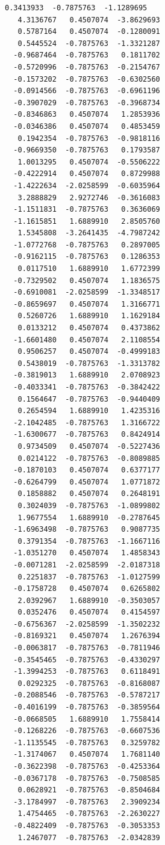 \documentclass[11pt]{article}
\begin{document}
\begin{Verbatim}[commandchars=\\\{\}]
   0.3413933  -0.7875763  -1.1289695
   4.3136767   0.4507074  -3.8629693
   0.5787164   0.4507074  -0.1280091
   0.5445524  -0.7875763  -1.3321287
  -0.9687464  -0.7875763   0.1811702
  -0.5720996  -0.7875763  -0.2154767
  -0.1573202  -0.7875763  -0.6302560
  -0.0914566  -0.7875763  -0.6961196
  -0.3907029  -0.7875763  -0.3968734
  -0.8346863   0.4507074   1.2853936
  -0.0346386   0.4507074   0.4853459
   0.1942354  -0.7875763  -0.9818116
  -0.9669350  -0.7875763   0.1793587
   1.0013295   0.4507074  -0.5506222
  -0.4222914   0.4507074   0.8729988
  -1.4222634  -2.0258599  -0.6035964
   3.2888829   2.9272746  -0.3616083
  -1.1511831  -0.7875763   0.3636069
  -1.1615851   1.6889910   2.8505760
   1.5345808  -3.2641435  -4.7987242
  -1.0772768  -0.7875763   0.2897005
  -0.9162115  -0.7875763   0.1286353
   0.0117510   1.6889910   1.6772399
  -0.7329502   0.4507074   1.1836575
  -0.6910081  -2.0258599  -1.3348517
  -0.8659697   0.4507074   1.3166771
   0.5260726   1.6889910   1.1629184
   0.0133212   0.4507074   0.4373862
  -1.6601480   0.4507074   2.1108554
   0.9506257   0.4507074  -0.4999183
   0.5438019  -0.7875763  -1.3313782
  -0.3819013   1.6889910   2.0708923
  -0.4033341  -0.7875763  -0.3842422
   0.1564647  -0.7875763  -0.9440409
   0.2654594   1.6889910   1.4235316
  -2.1042485  -0.7875763   1.3166722
  -1.6300677  -0.7875763   0.8424914
   0.9734509   0.4507074  -0.5227436
   0.0214122  -0.7875763  -0.8089885
  -0.1870103   0.4507074   0.6377177
  -0.6264799   0.4507074   1.0771872
   0.1858882   0.4507074   0.2648191
   0.3024039  -0.7875763  -1.0899802
   1.9677554   1.6889910  -0.2787645
  -1.6963498  -0.7875763   0.9087735
   0.3791354  -0.7875763  -1.1667116
  -1.0351270   0.4507074   1.4858343
  -0.0071281  -2.0258599  -2.0187318
   0.2251837  -0.7875763  -1.0127599
  -0.1758728   0.4507074   0.6265802
   2.0392967   1.6889910  -0.3503057
   0.0352476   0.4507074   0.4154597
  -0.6756367  -2.0258599  -1.3502232
  -0.8169321   0.4507074   1.2676394
  -0.0063817  -0.7875763  -0.7811946
  -0.3545465  -0.7875763  -0.4330297
  -1.3994253  -0.7875763   0.6118491
   0.0292325  -0.7875763  -0.8168087
  -0.2088546  -0.7875763  -0.5787217
  -0.4016199  -0.7875763  -0.3859564
  -0.0668505   1.6889910   1.7558414
  -0.1268226  -0.7875763  -0.6607536
  -1.1135545  -0.7875763   0.3259782
  -1.3174067   0.4507074   1.7681140
  -0.3622398  -0.7875763  -0.4253364
  -0.0367178  -0.7875763  -0.7508585
   0.0628921  -0.7875763  -0.8504684
  -3.1784997  -0.7875763   2.3909234
   1.4754465  -0.7875763  -2.2630227
  -0.4822409  -0.7875763  -0.3053353
   1.2467077  -0.7875763  -2.0342839

\end{Verbatim}
\end{document}
